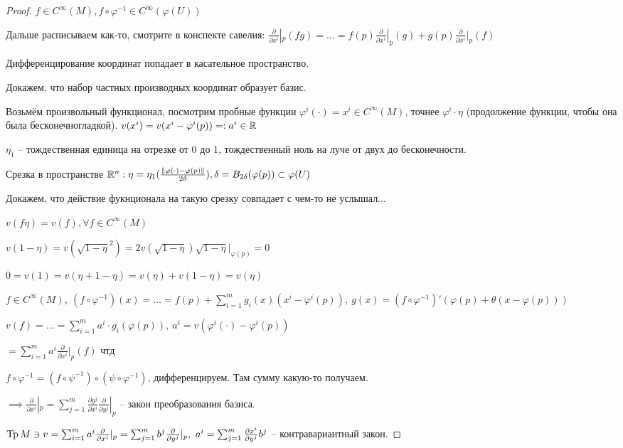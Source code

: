     \begin{proof}
      $f \in C^\infty (M), f \circ \varphi^{-1} \in C^\infty(\varphi(U))$

      Дальше расписываем как-то, смотрите в конспекте савелия: $\frac{\partial}{\partial x^i}|_p (fg) = \dotsc = f(p)\frac{\partial}{\partial x^i}|_p (g) + g(p) \frac{\partial}{\partial x^i}|_p(f)$

      Дифференцирование координат попадает в касательное пространство.

      Докажем, что набор частных производных координат образует базис.

      Возьмём произвольный функционал, посмотрим пробные функции $\varphi^i(\cdot) = x^i \in C^\infty(M)$, точнее $\varphi^i \cdot \eta$ (продолжение функции, чтобы она была бесконечногладкой).
      $v(x^i) = v(x^i - \varphi^i(p)) =: a^i \in \mathbb{R}$

      $\eta_1$ -- тождественная единица на отрезке от 0 до 1, тождественный ноль на луче от двух до бесконечности.

      Срезка в пространстве $\mathbb{R}^n: \eta = \eta_1(\frac{\| \varphi(\cdot) - \varphi(p)\|}{2\delta}), \delta = B_{2\delta}(\varphi(p)) \subset \varphi(U)$
      
      Докажем, что действие фукнционала на такую срезку совпадает с чем-то не услышал...

      $v(f\eta) = v(f), \forall f \in C^\infty(M)$

      $v(1-\eta) = v(\sqrt{1-\eta}^2) = 2v(\sqrt{1 - \eta})\sqrt{1 - \eta}|_{\varphi(p)} = 0$
      
      $0 = v(1) = v(\eta + 1 - \eta) = v(\eta) + v(1 - \eta) = v(\eta)$

      $f \in C^\infty(M), \ (f\circ \varphi^{-1})(x) = \dotsc =  f(p) + \sum^m_{i=1} g_i(x)(x^i - \varphi^i(p)), \ g(x) = (f\circ \varphi^{-1})' (\varphi(p) + \theta(x - \varphi(p)))$

      $v(f) = \dotsc = \sum^m_{i=1} a^i \cdot g_i(\varphi(p)), \ a^i = v(\varphi^i(\cdot) - \varphi^i(p))$

      $= \sum^m_{i=1} a^i \frac{\partial}{\partial x^i}|_p(f)$ чтд

      $f\circ \varphi^{-1} = (f\circ \psi^{-1}) \circ (\psi \circ \varphi^{-1})$, дифференцируем. Там сумму какую-то получаем.

      $\implies \frac{\partial}{\partial x^i}|_p = \sum^m_{j=1}\frac{\partial y^j}{\partial x^i} \frac{\partial }{\partial y^j}|_p$ -- закон преобразования базиса.

      $\operatorname{Tp} M \ni v = \sum^m_{i=1} a^i \frac{\partial}{\partial x^i} |_p = \sum^m_{j=1}b^j \frac{\partial }{\partial y^j} |_p,\ a^i = \sum^m_{j=1} \frac{\partial x^i}{\partial y^j} b^j$ -- контравариантный закон.

    \end{proof}
      
